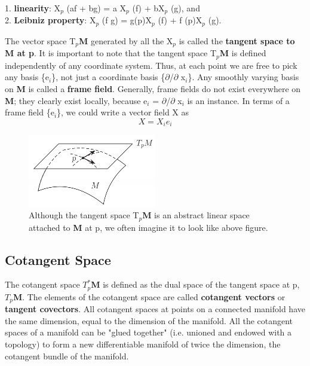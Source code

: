 1. \textbf{linearity}: X$_p$ (af + bg) = a X$_p$ (f) + bX$_p$ (g), and \\
2. \textbf{Leibniz property}: X$_p$ (f g) = g(p)X$_p$ (f) + f (p)X$_p$ (g).

The vector space T$_p$\textbf{M} generated by all the X$_p$ is called the \textbf{tangent space to
M at p}. It is important to note that the tangent space T$_p$\textbf{M} is defined independently of any
coordinate system. Thus, at each point we are free to pick any basis \{e$_i$\}, not just
a coordinate basis \{$\partial$/$\partial$ x$_i$\}. Any smoothly varying basis on \textbf{M} is called a \textbf{frame field}.
Generally, frame fields do not exist everywhere on \textbf{M}; they clearly exist
locally, because e$_i$ = $\partial$/$\partial$ x$_i$  is an instance. In terms of a frame field \{e$_i$\}, we could
write a vector field X as
\begin{equation}
    X = X_i e_i
\end{equation}

\begin{figure}[ht]
    \begin{center}
        \includegraphics[width=0.5\textwidth]{figures/tangent-space.png}
        \caption{Although the tangent space T$_p$\textbf{M} is an abstract linear space attached to
        \textbf{M} at p, we often imagine it to look like above figure.}
    \end{center}
\end{figure}

\subsection{Cotangent Space}
The cotangent space $T_{p}^{*}$\textbf{M} is defined as the dual space of the tangent space at p, 
$T_{p}$\textbf{M}. The elements of the cotangent space are called \textbf{cotangent vectors} or \textbf{tangent covectors}.
All cotangent spaces at points on a connected manifold have the same dimension, equal to the dimension of the manifold. 
All the cotangent spaces of a manifold can be "glued together" (i.e. unioned and endowed with a topology) to form a new differentiable manifold of twice the dimension, the cotangent bundle of the manifold.

